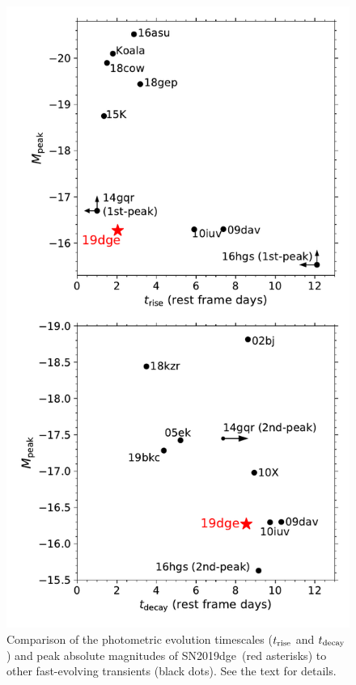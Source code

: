 \documentclass[twocolumn]{aastex63}
\newcommand{\name}{SN2019dge}
\begin{document}
\begin{CJK*}{UTF8}{gbsn}
\begin{figure}[htbp!]
	\centering
	\includegraphics[width=\columnwidth]{figures/compare_mag.pdf}
	\caption{Comparison of the photometric evolution timescales ($t_{\rm rise}$ and $t_{\rm  
			decay}$) and peak absolute magnitudes of \name\ (red asterisks) to other fast-evolving 
			transients (black dots). See the text for details.
		\label{fig:compare_mag}}
\end{figure}


\end{CJK*}
\end{document}
